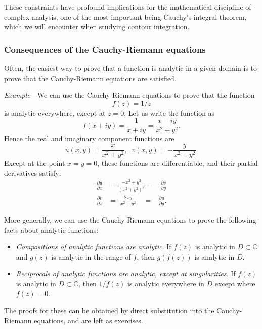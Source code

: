 \documentclass[10pt,a4paper]{article}
\begin{document}
These constraints have profound implications for the mathematical
discipline of complex analysis, one of the most important being
Cauchy's integral theorem, which we will encounter when studying
contour integration.

\subsubsection{Consequences of the Cauchy-Riemann equations}
\label{consequences-of-the-cauchy-riemann-equations}

Often, the easiest way to prove that a function is analytic in a given
domain is to prove that the Cauchy-Riemann equations are satisfied.

\begin{framed} \noindent
  \textit{Example}---We can use the Cauchy-Riemann equations to prove
  that the function\[f(z)=1/z\]is analytic everywhere, except at $z =
  0$. Let us write the function as
  \begin{equation*}
    f(x+iy) = \frac{1}{x+iy} = \frac{x-iy}{x^2+y^2}.
  \end{equation*}
  Hence the real and imaginary component functions are
  \begin{equation*}
    u(x,y) = \frac{x}{x^2+y^2}, \;\;v(x,y) = -
    \frac{y}{x^2+y^2}.
  \end{equation*}
  Except at the point $x = y = 0$, these functions are differentiable,
  and their partial derivatives
  satisfy:
  \begin{align*}
    \frac{\partial u}{\partial x} &=
    \frac{-x^2+y^2}{(x^2+y^2)^2} = \;\;\;\frac{\partial
      v}{\partial y} \\ \frac{\partial v}{\partial x} &= \;
    \frac{2xy}{x^2+y^2} \;\;\;\,= -\frac{\partial u}{\partial
      y}.
  \end{align*}
\end{framed}

More generally, we can use the Cauchy-Riemann equations to prove the
following facts about analytic functions:
\begin{itemize}
\item
  \emph{Compositions of analytic functions are analytic}. If $f(z)$ is
  analytic in $D \subset \mathbb{C}$ and $g(z)$ is analytic in the
  range of $f$, then $g(f(z))$ is analytic in $D$.
\item
  \emph{Reciprocals of analytic functions are analytic, except at
  singularities}. If $f(z)$ is analytic in $D \subset \mathbb{C}$,
  then $1/f(z)$ is analytic everywhere in $D$ except where
  $f(z) = 0$.
\end{itemize}
The proofs for these can be obtained by direct substitution into the
Cauchy-Riemann equations, and are left as exercises.
\end{document}
